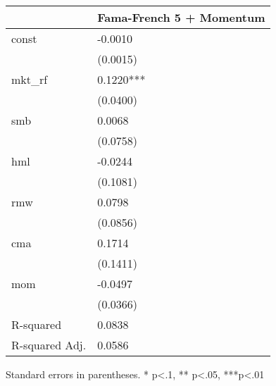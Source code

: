 \begin{table}
\caption{}
\label{}
\begin{center}
\begin{tabular}{ll}
\hline
               & Fama-French 5 + Momentum  \\
\hline
const          & -0.0010                   \\
               & (0.0015)                  \\
mkt\_rf        & 0.1220***                 \\
               & (0.0400)                  \\
smb            & 0.0068                    \\
               & (0.0758)                  \\
hml            & -0.0244                   \\
               & (0.1081)                  \\
rmw            & 0.0798                    \\
               & (0.0856)                  \\
cma            & 0.1714                    \\
               & (0.1411)                  \\
mom            & -0.0497                   \\
               & (0.0366)                  \\
R-squared      & 0.0838                    \\
R-squared Adj. & 0.0586                    \\
\hline
\end{tabular}
\end{center}
\end{table}
\bigskip
Standard errors in parentheses. \newline 
* p<.1, ** p<.05, ***p<.01